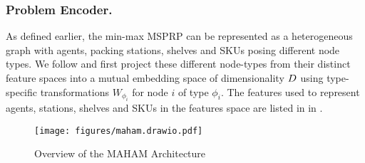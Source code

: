 \subsubsection{Problem Encoder.}
\label{sec:encoder}



As defined earlier, the min-max MSPRP can be represented as a heterogeneous graph with agents, packing stations, shelves and SKUs posing different node types. We follow \cite{luttmann2024neural} and first project these different node-types from their distinct feature spaces into a mutual embedding space of dimensionality ${D}$ using type-specific transformations $W_{\phi_i}$ for node $i$ of type $\phi_i$. The features used to represent agents, stations, shelves and SKUs in the features space are listed in  in .

\begin{figure*}[t]
    \centering
    \texttt{[image: figures/maham.drawio.pdf]}
    \vspace{-5mm}
    \caption{Overview of the MAHAM Architecture}
    \vspace{-5mm}
    \label{fig:maham}
\end{figure*}



